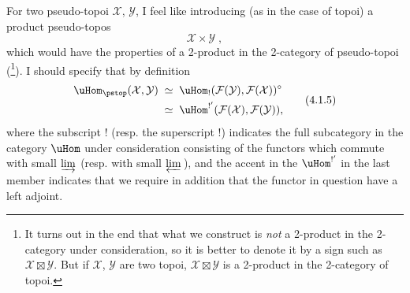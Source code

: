 For two pseudo-topoi $\mathcal{X}$, $\mathcal{Y}$, I feel like introducing (as in the case of topoi) a product pseudo-topos
\[
\mathcal{X}\times\mathcal{Y}\;,
\tag*{(4.1.4)}
\]
which would have the properties of a 2-product in the 2-category of pseudo-topoi (\footnote{It turns out in the end that what we construct is \textit{not} a 2-product in the 2-category under consideration, so it is better to denote it by a sign such as $\mathcal{X}\boxtimes\mathcal{Y}$. But if $\mathcal{X}$, $\mathcal{Y}$ are two topoi, $\mathcal{X}\boxtimes\mathcal{Y}$ is a 2-product in the 2-category of topoi.}). I should specify that by definition
\[
\begin{aligned}
\uHom_{\pstop}(\mathcal{X},\mathcal{Y}) \;&\simeq\; \uHom_!(\mathcal{F}(\mathcal{Y}),\mathcal{F}(\mathcal{X}))^\circ\\
&\simeq\; \uHom^{!'}(\mathcal{F}(\mathcal{X}),\mathcal{F}(\mathcal{Y})),
\end{aligned}
\tag*{(4.1.5)}
\]
where the subscript ! (resp. the superscript !) indicates the full subcategory in the category $\uHom$ under consideration consisting of the functors which commute with small $\varinjlim$ (resp. with small
$\varprojlim$\,), and the accent in the $\uHom^{!'}$ in the last member indicates that we require in addition that the functor in question have a left adjoint.


